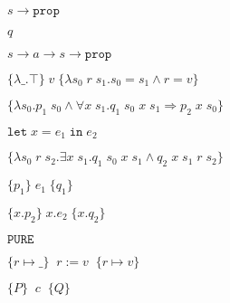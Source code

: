 \documentclass[10pt]{book}
\begin{document}
\begin{mdSnippets}
\begin{mdInlineSnippet}[589475617a8654ee215dd1ec926d990c]
$s \rightarrow \mathtt{prop}$\end{mdInlineSnippet}%
\begin{mdInlineSnippet}[7694f4a66316e53c8cdd9d9954bd611d]%
$q$\end{mdInlineSnippet}%
\begin{mdInlineSnippet}%
$s \rightarrow a \rightarrow s \rightarrow \mathtt{prop}$\end{mdInlineSnippet}%
\begin{mdInlineSnippet}[c3a331e9a8ab0706179ffdc1a566b750]%
$\{\lambda \_.\top\}\;v\;\{\lambda s_0\;r\;s_1. s_0 = s_1 \wedge r = v\}$\end{mdInlineSnippet}%
\begin{mdInlineSnippet}[fb248c79948d47d0021a3e2b08b15c58]%
$\{\lambda s_0. p_1\;s_0 \wedge \forall x\;s_1. q_1\;s_0\;x\;s_1 \Rightarrow p_2\;x\;s_0\}$\end{mdInlineSnippet}%
\begin{mdInlineSnippet}%
$\mathtt{let}\;x = e_1\;\mathtt{in}\;e_2$\end{mdInlineSnippet}%
\begin{mdInlineSnippet}%
$\{\lambda s_0\;r\;s_2. \exists x\;s_1. q_1\;s_0\;x\;s_1 \wedge q_2\;x\;s_1\;r\;s_2\}$\end{mdInlineSnippet}%
\begin{mdInlineSnippet}[83b00a50331fe8d578eebb62ee762bb8]%
$\{p_1\}\;e_1\;\{q_1\}$\end{mdInlineSnippet}%
\begin{mdInlineSnippet}[9e12216f4060102035353dce89bc8d9f]%
$\{x.p_2\}\;x.e_2\;\{x.q_2\}$\end{mdInlineSnippet}%
\begin{mdInlineSnippet}[83365c67bd390d059181734569c55a0a]%
$\mathtt{PURE}$\end{mdInlineSnippet}%
\begin{mdInlineSnippet}%
$\{r \mapsto \_\}\;\;r := v\;\;\{r \mapsto v\}$\end{mdInlineSnippet}%
\begin{mdInlineSnippet}%
$\{P\}\;\;c\;\;\{Q\}$\end{mdInlineSnippet}%

\end{mdSnippets}
\end{document}

